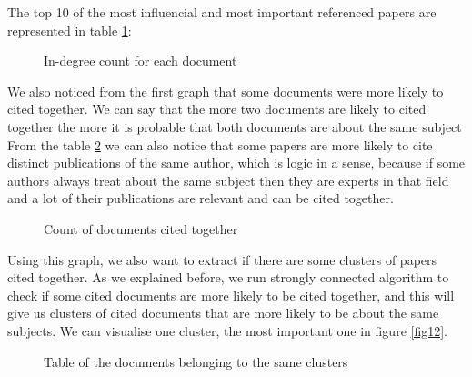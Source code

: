 \documentclass[article,twocolumn]{IEEEtran}
\begin{document}
    The top 10 of the most influencial and most important referenced papers
are represented in table \ref{indegree}:


    \begin{figure}
        \begin{center}\end{center}
        \caption{In-degree count for each document}
        \label{indegree}
    \end{figure}
    
    We also noticed from the first graph that some documents were more
likely to cited together. We can say that the more two documents are
likely to cited together the more it is probable that both documents are
about the same subject From the table \ref{fig8} we can also notice that
some papers are more likely to cite distinct publications of the same
author, which is logic in a sense, because if some authors always treat
about the same subject then they are experts in that field and a lot of
their publications are relevant and can be cited together.


    \begin{figure}
        \begin{center}\end{center}
        \caption{Count of documents cited together}
        \label{fig8}
    \end{figure}
    
    Using this graph, we also want to extract if there are some clusters of
papers cited together. As we explained before, we run strongly connected
algorithm to check if some cited documents are more likely to be cited
together, and this will give us clusters of cited documents that are
more likely to be about the same subjects. We can visualise one cluster,
the most important one in figure \ref{fig12}.



    \begin{figure}
        \begin{center}\end{center}
        \caption{Table of the documents belonging to the same clusters}
        \label{fig9}
    \end{figure}
    
\end{document}

